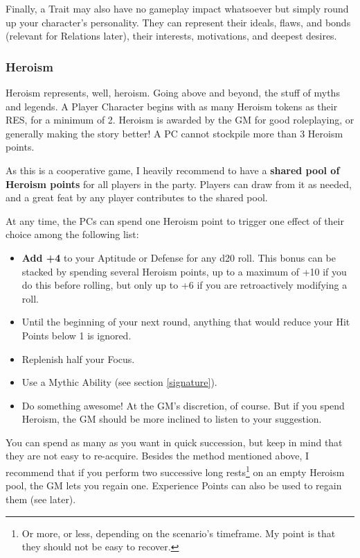 Finally, a Trait may also have no gameplay impact whatsoever but simply round up your character's personality. They can represent their ideals, flaws, and bonds (relevant for Relations later), their interests, motivations, and deepest desires.

\subsubsection{Heroism}

\label{heroism}

Heroism represents, well, heroism. Going above and beyond, the stuff of myths and legends. A Player Character begins with as many Heroism tokens as their RES, for a minimum of 2. Heroism is awarded by the GM for good roleplaying, or generally making the story better! A PC cannot stockpile more than 3 Heroism points. 

As this is a cooperative game, I heavily recommend to have a \textbf{shared pool of Heroism points} for all players in the party. Players can draw from it as needed, and a great feat by any player contributes to the shared pool.

At any time, the PCs can spend one Heroism point to trigger one effect of their choice among the following list:

\begin{itemize}
    \item \textbf{Add +4} to your Aptitude or Defense for any d20 roll. This bonus can be stacked by spending several Heroism points, up to a maximum of +10 if you do this before rolling, but only up to +6 if you are retroactively modifying a roll.
    \item Until the beginning of your next round, anything that would reduce your Hit Points below 1 is ignored.
    \item Replenish half your Focus.
    \item Use a Mythic Ability (see section \ref{signature}).
    \item Do something awesome! At the GM's discretion, of course. But if you spend Heroism, the GM should be more inclined to listen to your suggestion.
\end{itemize}

You can spend as many as you want in quick succession, but keep in mind that they are not easy to re-acquire. Besides the method mentioned above, I recommend that if you perform two successive long rests\footnote{Or more, or less, depending on the scenario's timeframe. My point is that they should not be easy to recover.} on an empty Heroism pool, the GM lets you regain one. Experience Points can also be used to regain them (see later).

